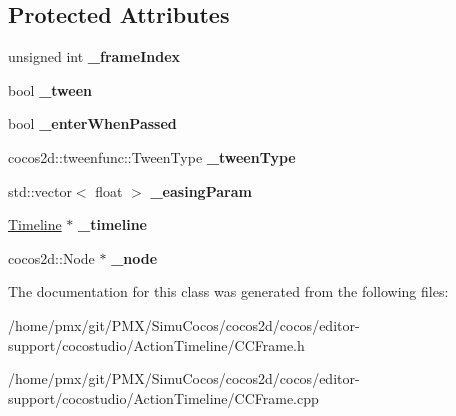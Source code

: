 \subsection*{Protected Attributes}
\begin{DoxyCompactItemize}
\item 
\mbox{\label{classFrame_ab61b9afe621afa2519ed594974f03140}} 
unsigned int {\bfseries \+\_\+frame\+Index}
\item 
\mbox{\label{classFrame_ac78c2ad755b1667a0b6b19672b7bf6dd}} 
bool {\bfseries \+\_\+tween}
\item 
\mbox{\label{classFrame_a203b52065d15b0029dcdbf48fd82442f}} 
bool {\bfseries \+\_\+enter\+When\+Passed}
\item 
\mbox{\label{classFrame_ab2e0b36f295f877dbcff9cdd585b31bd}} 
cocos2d\+::tweenfunc\+::\+Tween\+Type {\bfseries \+\_\+tween\+Type}
\item 
\mbox{\label{classFrame_acc94c84ca905c733cabb288a74d1b8c4}} 
std\+::vector$<$ float $>$ {\bfseries \+\_\+easing\+Param}
\item 
\mbox{\label{classFrame_ab53048718a13a15476e7a98eed4e0c8c}} 
\hyperlink{classTimeline}{Timeline} $\ast$ {\bfseries \+\_\+timeline}
\item 
\mbox{\label{classFrame_ad196851f6a8998b81772efb250a63af6}} 
cocos2d\+::\+Node $\ast$ {\bfseries \+\_\+node}
\end{DoxyCompactItemize}


The documentation for this class was generated from the following files\+:\begin{DoxyCompactItemize}
\item 
/home/pmx/git/\+P\+M\+X/\+Simu\+Cocos/cocos2d/cocos/editor-\/support/cocostudio/\+Action\+Timeline/C\+C\+Frame.\+h\item 
/home/pmx/git/\+P\+M\+X/\+Simu\+Cocos/cocos2d/cocos/editor-\/support/cocostudio/\+Action\+Timeline/C\+C\+Frame.\+cpp\end{DoxyCompactItemize}
